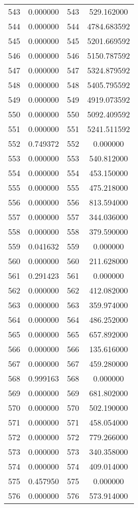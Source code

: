 \documentclass[12pt]{article}
\begin{document}
\begin{longtable}{@{}cccc@{}}
543 & 0.000000 & 543 & 529.162000 \\
544 & 0.000000 & 544 & 4784.683592 \\
545 & 0.000000 & 545 & 5201.669592 \\
546 & 0.000000 & 546 & 5150.787592 \\
547 & 0.000000 & 547 & 5324.879592 \\
548 & 0.000000 & 548 & 5405.795592 \\
549 & 0.000000 & 549 & 4919.073592 \\
550 & 0.000000 & 550 & 5092.409592 \\
551 & 0.000000 & 551 & 5241.511592 \\
552 & 0.749372 & 552 & 0.000000 \\
553 & 0.000000 & 553 & 540.812000 \\
554 & 0.000000 & 554 & 453.150000 \\
555 & 0.000000 & 555 & 475.218000 \\
556 & 0.000000 & 556 & 813.594000 \\
557 & 0.000000 & 557 & 344.036000 \\
558 & 0.000000 & 558 & 379.590000 \\
559 & 0.041632 & 559 & 0.000000 \\
560 & 0.000000 & 560 & 211.628000 \\
561 & 0.291423 & 561 & 0.000000 \\
562 & 0.000000 & 562 & 412.082000 \\
563 & 0.000000 & 563 & 359.974000 \\
564 & 0.000000 & 564 & 486.252000 \\
565 & 0.000000 & 565 & 657.892000 \\
566 & 0.000000 & 566 & 135.616000 \\
567 & 0.000000 & 567 & 459.280000 \\
568 & 0.999163 & 568 & 0.000000 \\
569 & 0.000000 & 569 & 681.802000 \\
570 & 0.000000 & 570 & 502.190000 \\
571 & 0.000000 & 571 & 458.054000 \\
572 & 0.000000 & 572 & 779.266000 \\
573 & 0.000000 & 573 & 340.358000 \\
574 & 0.000000 & 574 & 409.014000 \\
575 & 0.457950 & 575 & 0.000000 \\
576 & 0.000000 & 576 & 573.914000 \\

\end{longtable}
\end{document}
